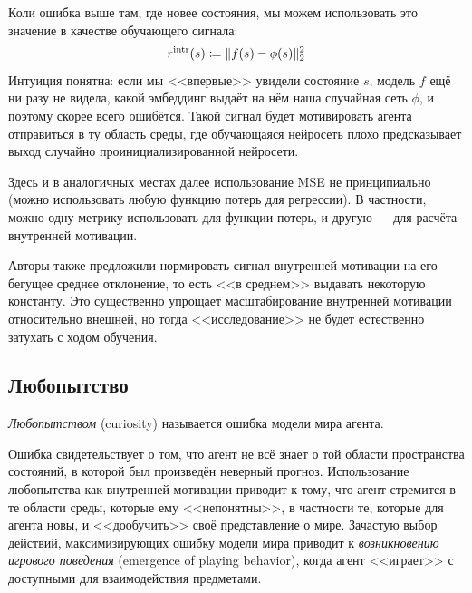 Коли ошибка выше там, где новее состояния, мы можем использовать это значение в качестве обучающего сигнала:
$$r^{\mathrm{intr}}(s) \coloneqq \|f(s) - \phi(s)\|_2^2$$
Интуиция понятна: если мы <<впервые>> увидели состояние $s$, модель $f$ ещё ни разу не видела, какой эмбеддинг выдаёт на нём наша случайная сеть $\phi$, и поэтому скорее всего ошибётся. Такой сигнал будет мотивировать агента отправиться в ту область среды, где обучающаяся нейросеть плохо предсказывает выход случайно проинициализированной нейросети.

\begin{remark}
Здесь и в аналогичных местах далее использование MSE не принципиально (можно использовать любую функцию потерь для регрессии). В частности, можно одну метрику использовать для функции потерь, и другую --- для расчёта внутренней мотивации.
\end{remark}


\begin{remark}
Авторы также предложили нормировать сигнал внутренней мотивации на его бегущее среднее отклонение, то есть <<в среднем>> выдавать некоторую константу. Это существенно упрощает масштабирование внутренней мотивации относительно внешней, но тогда <<исследование>> не будет естественно затухать с ходом обучения.
\end{remark}

\subsection{Любопытство}

\begin{definition}
\emph{Любопытством} (curiosity) называется ошибка модели мира агента.
\end{definition}

Ошибка свидетельствует о том, что агент не всё знает о той области пространства состояний, в которой был произведён неверный прогноз. Использование любопытства как внутренней мотивации приводит к тому, что агент стремится в те области среды, которые ему <<непонятны>>, в частности те, которые для агента новы, и <<дообучить>> своё представление о мире. Зачастую выбор действий, максимизирующих ошибку модели мира приводит к \emph{возникновению игрового поведения} (emergence of playing behavior), когда агент <<играет>> с доступными для взаимодействия предметами.

